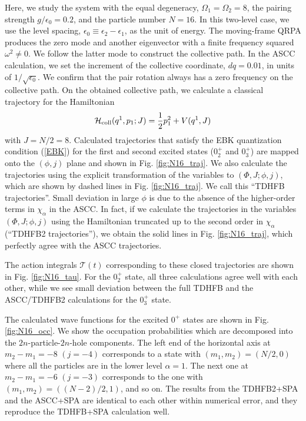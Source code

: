 \documentclass[11pt]{book} %
\begin{document}
Here, we study the system with the equal degeneracy,
$\Omega_1=\Omega_2=8$, 
the pairing strength $g/\epsilon_0=0.2$,
and the particle number $N=16$. 
In this two-level case, we use the level spacing,
$\epsilon_0\equiv \epsilon_2-\epsilon_1$,
as the unit of energy.
The moving-frame QRPA produces the zero mode and another eigenvector
with a finite frequency squared $\omega^2\neq 0$.
We follow the latter mode to construct the collective path.
In the ASCC calculation, we set the increment of the
collective coordinate, $dq=0.01$,
in units of $1/\sqrt{\epsilon_0}$.
We confirm that the pair rotation always has a zero frequency
on the collective path.
On the obtained collective path, we calculate a classical trajectory
for the Hamiltonian
\begin{equation}
\mathcal{H}_{\rm coll}(q^1,p_1;J)=\frac{1}{2} p_1^2 + V(q^1,J)
\end{equation}
with $J=N/2=8$.
Calculated trajectories that satisfy the EBK quantization condition
(\ref{EBK}) for the first and second excited states ($0_2^+$ and $0_3^+$)
are mapped onto the $(\phi,j)$ plane and
shown in Fig. \ref{fig:N16_traj}.
We also calculate the trajectories using the explicit transformation
of the variables to $(\Phi,J;\phi,j)$, which
are shown by dashed lines in Fig. \ref{fig:N16_traj}.
We call this ``TDHFB trajectories''.
Small deviation in large $\phi$ is due to the absence of the higher-order
terms in $\chi_\alpha$ in the ASCC.
In fact, if we calculate the trajectories in the variables
$(\Phi,J;\phi,j)$ using the Hamiltonian truncated up to the
second order in $\chi_\alpha$ (``TDHFB2 trajectories''),
we obtain the solid lines in Fig. \ref{fig:N16_traj},
which perfectly agree with the ASCC trajectories.

The action integrals $\mathcal{T}(t)$ corresponding to
these closed trajectories are shown in Fig. \ref{fig:N16_tau}.
For the $0_2^+$ state,
all three calculations agree well
with each other, while we see small deviation between the full TDHFB
and the ASCC/TDHFB2 calculations for the $0_3^+$ state.

The calculated wave functions for the excited $0^+$ states 
are shown in Fig. \ref{fig:N16_occ}. 
We show the occupation probabilities which are decomposed 
into the $2n$-particle-$2n$-hole components. 
The left end of the horizontal axis at $m_2-m_1=-8$ $(j=-4)$
corresponds to a state with $(m_1,m_2)=(N/2,0)$ where all the particles
are in the lower level $\alpha=1$.
The next one at $m_2-m_1=-6$ $(j=-3)$ corresponds to the one with
$(m_1,m_2)=((N-2)/2,1)$, and so on.
The results from the TDHFB2+SPA and the ASCC+SPA are identical to each other
within numerical error, and they reproduce
the TDHFB+SPA calculation well.
\end{document}
